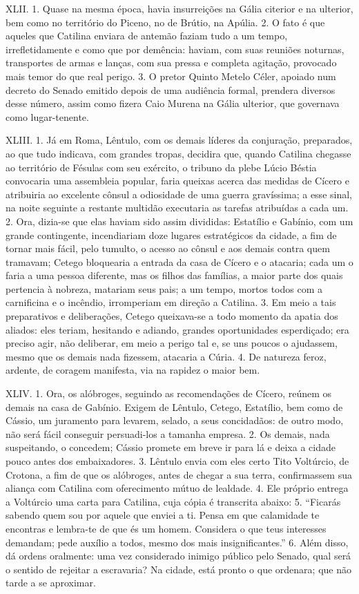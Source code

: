 XLII. 1. Quase na mesma época, havia insurreições na Gália citerior e na
ulterior, bem como no território do Piceno, no de Brútio, na Apúlia. 2. O fato
é que aqueles que Catilina enviara de antemão faziam tudo a um tempo,
irrefletidamente e como que por demência: haviam, com suas reuniões noturnas,
transportes de armas e lanças, com sua pressa e completa agitação, provocado
mais temor do que real perigo. 3. O pretor Quinto Metelo Céler, apoiado num
decreto do Senado emitido depois de uma audiência formal, prendera diversos
desse número, assim como fizera Caio Murena na Gália ulterior, que governava como
lugar-tenente.

XLIII. 1. Já em Roma, Lêntulo, com os demais líderes da conjuração, preparados,
ao que tudo indicava, com grandes tropas, decidira que, quando Catilina
chegasse ao território de Fésulas com seu exército, o tribuno da plebe Lúcio
Béstia convocaria uma assembleia popular, faria queixas acerca das medidas de
Cícero e atribuiria ao excelente cônsul a odiosidade de uma guerra gravíssima;
a esse sinal, na noite seguinte a restante multidão executaria as tarefas
atribuídas a cada um. 2. Ora, dizia-se que elas haviam sido assim divididas:
Estatílio e Gabínio, com um grande contingente, incendiariam doze lugares
estratégicos da cidade, a fim de tornar mais fácil, pelo tumulto, o acesso ao
cônsul e aos demais contra quem tramavam; Cetego bloquearia a entrada da casa
de Cícero e o atacaria; cada um o faria a uma pessoa diferente, mas os filhos
das famílias, a maior parte dos quais pertencia à nobreza, matariam seus pais;
a um tempo, mortos todos com a carnificina e o incêndio, irromperiam em direção
a Catilina. 3. Em meio a tais preparativos e deliberações, Cetego queixava-se a
todo momento da apatia dos aliados: eles teriam, hesitando e adiando, grandes
oportunidades esperdiçado; era preciso agir, não deliberar, em meio a perigo
tal e, se uns poucos o ajudassem, mesmo que os demais nada fizessem, atacaria a
Cúria. 4. De natureza feroz, ardente, de coragem manifesta, via na rapidez o
maior bem.

XLIV. 1. Ora, os alóbroges, seguindo as recomendações de Cícero, reúnem os
demais na casa de Gabínio. Exigem de Lêntulo, Cetego, Estatílio, bem como de
Cássio, um juramento para levarem, selado, a seus concidadãos: de outro modo,
não será fácil conseguir persuadi-los a tamanha empresa. 2. Os demais, nada
suspeitando, o concedem; Cássio promete em breve ir para lá e deixa a cidade
pouco antes dos embaixadores. 3. Lêntulo envia com eles certo Tito Voltúrcio,
de Crotona, a fim de que os alóbroges, antes de chegar a sua terra,
confirmassem sua aliança com Catilina com oferecimento mútuo de lealdade. 4.
Ele próprio entrega a Voltúrcio uma carta para Catilina, cuja cópia é
transcrita abaixo: 5. “Ficarás sabendo quem sou por aquele que enviei a ti.
Pensa em que calamidade te encontras e lembra-te de que és um homem. Considera
o que teus interesses demandam; pede auxílio a todos, mesmo dos mais
insignificantes.” 6. Além disso, dá ordens oralmente: uma vez considerado
inimigo público pelo Senado, qual será o sentido de rejeitar a escravaria? Na
cidade, está pronto o que ordenara; que não tarde a se aproximar.


